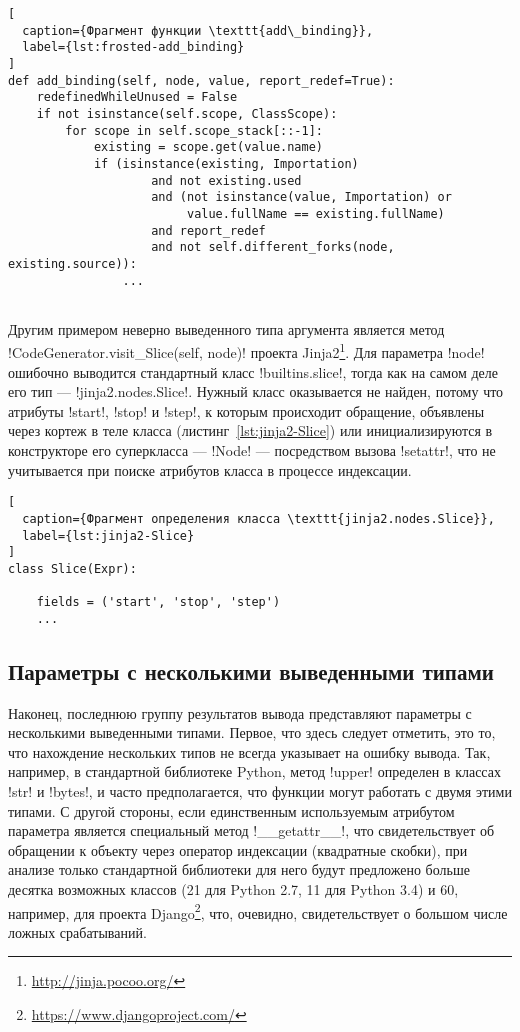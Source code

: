 \begin{lstlisting}[
  caption={Фрагмент функции \texttt{add\_binding}},
  label={lst:frosted-add_binding}
]
def add_binding(self, node, value, report_redef=True):
    redefinedWhileUnused = False
    if not isinstance(self.scope, ClassScope):
        for scope in self.scope_stack[::-1]:
            existing = scope.get(value.name)
            if (isinstance(existing, Importation)
                    and not existing.used
                    and (not isinstance(value, Importation) or
                         value.fullName == existing.fullName)
                    and report_redef
                    and not self.different_forks(node, existing.source)):
                ...
    
\end{lstlisting}

Другим примером неверно выведенного типа аргумента является метод
!CodeGenerator.visit_Slice(self, node)! проекта
Jinja2\footnote{\url{http://jinja.pocoo.org/}}. Для параметра !node!
ошибочно выводится стандартный класс !builtins.slice!, тогда как на самом деле
его тип --- !jinja2.nodes.Slice!. Нужный класс оказывается не найден, потому что атрибуты
!start!, !stop! и !step!, к которым происходит обращение, объявлены через кортеж
в теле класса (листинг~\ref{lst:jinja2-Slice}) или инициализируются в
конструкторе его суперкласса --- !Node! --- посредством вызова !setattr!, что не
учитывается при поиске атрибутов класса в процессе индексации.

\begin{lstlisting}[
  caption={Фрагмент определения класса \texttt{jinja2.nodes.Slice}},
  label={lst:jinja2-Slice}
]
class Slice(Expr):

    fields = ('start', 'stop', 'step')
    ...

\end{lstlisting}

\subsection{Параметры с несколькими выведенными типами}
\label{sub:scattered-type-parameters}

Наконец, последнюю группу результатов вывода представляют параметры с
несколькими выведенными типами. Первое, что здесь следует отметить, это то, что
нахождение нескольких типов не всегда указывает на ошибку вывода. Так, например,
в стандартной библиотеке Python, метод !upper! определен в классах !str! и
!bytes!, и часто предполагается, что функции могут работать с двумя этими
типами. С другой стороны, если единственным используемым атрибутом параметра
является специальный метод !__getattr__!, что свидетельствует об обращении к
объекту через оператор индексации (квадратные скобки), при анализе только
стандартной библиотеки для него будут предложено больше десятка возможных
классов (21 для Python 2.7, 11 для Python 3.4) и 60, например, для проекта
Django\footnote{\url{https://www.djangoproject.com/}}, что, очевидно,
свидетельствует о большом числе ложных срабатываний. 

